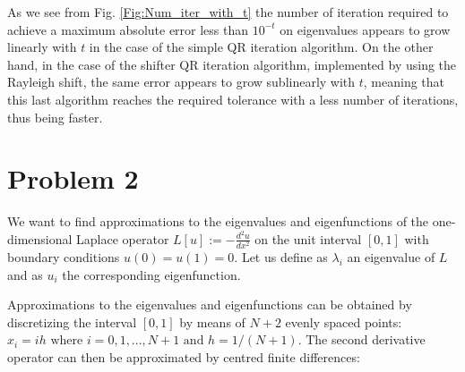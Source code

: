 \documentclass[a4paper,11pt]{article}
\newcommand{\R}{\mathbb{R}}
\begin{document}
\noindent As we see from Fig. \ref{Fig:Num_iter_with_t}  the number of iteration required to achieve a maximum absolute error less than $10^{-t}$ on eigenvalues appears to grow linearly with $t$ in the case of the simple QR iteration algorithm. On the other hand, in the case of the shifter QR iteration algorithm, implemented by using the Rayleigh shift, the same error appears to grow sublinearly with $t$, meaning that this last algorithm reaches the required tolerance with a less number of iterations, thus being faster.

	
\section*{Problem 2}	
We want to find approximations to the eigenvalues and eigenfunctions of the one-dimensional Laplace operator $L[u] := - \frac{d^2 u }{dx^2}$ on the unit interval $[0,1]$ with boundary conditions $u(0) = u(1) = 0$. Let us define as $\lambda_{i}$ an eigenvalue of $L$ and as $u_{i}$  the corresponding eigenfunction.
%
%

\noindent Approximations to the eigenvalues and eigenfunctions can be obtained by discretizing the interval $[0, 1]$ by means of $N+2$ evenly spaced points: $x_i =ih \text{ where } i=0,1,...,N+1 \text{ and } h=1/(N+1)$. The second derivative operator can then be approximated by centred finite differences:
\end{document}
